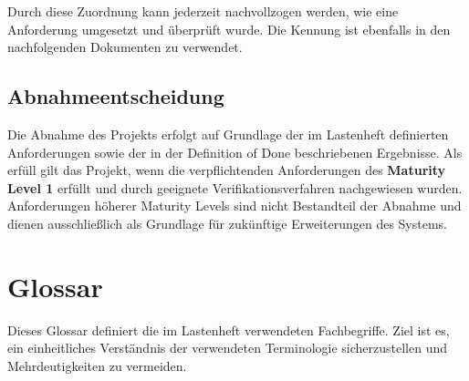 \documentclass[
  a4paper,
  12pt,
  DIV=12,        %
  parskip=half,  %
  headings=small %
]{scrartcl}
\theoremstyle{definition}
\theoremstyle{definition}
\begin{document}
Durch diese Zuordnung kann jederzeit nachvollzogen werden, wie eine
Anforderung umgesetzt und überprüft wurde. Die Kennung ist ebenfalls in
den nachfolgenden Dokumenten zu verwendet.

\subsection{Abnahmeentscheidung}\label{abnahmeentscheidung}

Die Abnahme des Projekts erfolgt auf Grundlage der im Lastenheft
definierten Anforderungen sowie der in der Definition of Done
beschriebenen Ergebnisse. Als erfüll gilt das Projekt, wenn die
verpflichtenden Anforderungen des \textbf{Maturity Level 1} erfüllt und
durch geeignete Verifikationsverfahren nachgewiesen wurden.
Anforderungen höherer Maturity Levels sind nicht Bestandteil der Abnahme
und dienen ausschließlich als Grundlage für zukünftige Erweiterungen des
Systems.

\section{Glossar}\label{glossar}

Dieses Glossar definiert die im Lastenheft verwendeten Fachbegriffe.
Ziel ist es, ein einheitliches Verständnis der verwendeten Terminologie
sicherzustellen und Mehrdeutigkeiten zu vermeiden.
\end{document}
